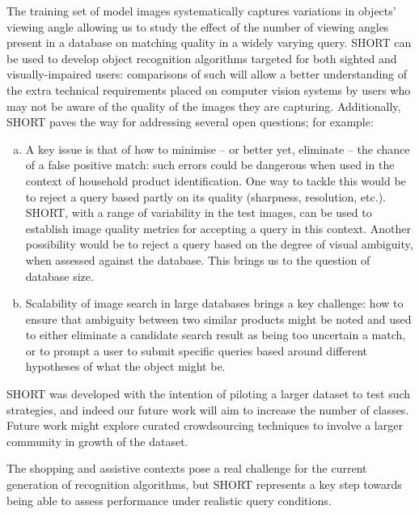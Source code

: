 The training set of model images systematically captures variations in objects' viewing angle allowing us to study the effect of the number of viewing angles present in a database on matching quality in a widely varying query. SHORT can be used to develop object recognition algorithms targeted for both sighted and visually-impaired users: comparisons of such will allow a better understanding of the extra technical requirements placed on computer vision systems by users who may not be aware of the quality of the images they are capturing. Additionally, SHORT paves the way for addressing several open questions; for example:

\begin{enumerate}[a)]
\item 
A key issue is that of how to minimise -- or better yet, eliminate -- the chance of a false positive match: such errors could be dangerous when used in the context of household product identification. One way to tackle this would be to reject a query based partly on its quality (sharpness, resolution, etc.). SHORT, with a range of variability in the test images, can be used to establish image quality metrics for accepting a query in this context. Another possibility would be to reject a query based on the degree of visual ambiguity, when assessed against the database. This brings us to the question of database size.

\item Scalability of image search in large databases brings a key challenge: how to ensure that ambiguity between two similar products might be noted and used to either eliminate a candidate search result as being too uncertain a match, or to prompt a user to submit specific queries based around different hypotheses of what the object might be. 

\end{enumerate}


SHORT was developed with the intention of piloting a larger dataset to test such strategies, and indeed our future work will aim to increase the number of classes. Future work might explore curated crowdsourcing techniques to involve a larger community in growth of the dataset.


The shopping and assistive contexts pose a real challenge for the current generation of recognition algorithms, but SHORT represents a key step towards being able to assess performance under realistic query conditions.




